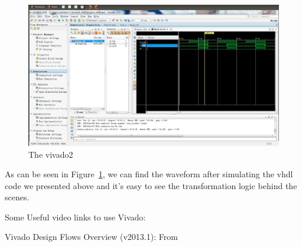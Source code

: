 \begin{figure}[ht!]
\centering
\includegraphics[scale=0.25]{eps/vivado2.eps}
\caption{The vivado2}
\label{vivado2}
\end{figure}

As can be seen in Figure~\ref{vivado2}, we can find the waveform after
simulating the vhdl code we presented above and it's easy to see the
transformation logic behind the scenes.

Some Useful video links to use Vivado:


Vivado Design Flows Overview (v2013.1): From \cite{59}

